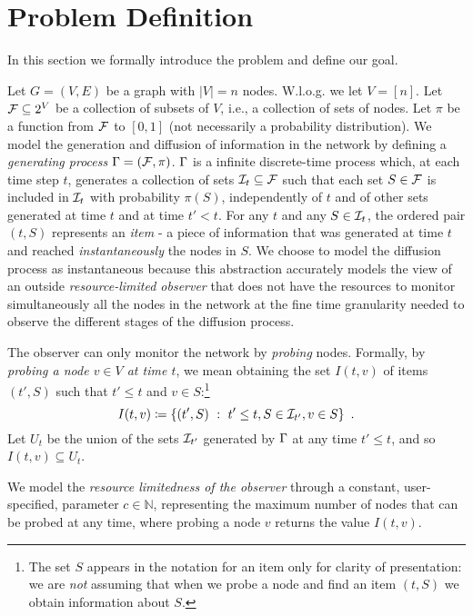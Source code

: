 \section{Problem Definition}\label{sec:prelims}
In this section we formally introduce the problem and define our goal.

Let $G=(V,E)$ be a graph with $|V|=n$ nodes. W.l.o.g. we let $V=[n]$. Let
$\mathcal{F}\subseteq 2^V$ be a collection of subsets of $V$, i.e., a collection of
sets of nodes. Let $\pi$ be a function from $\mathcal{F}$ to $[0,1]$ (not
necessarily a probability distribution). We model the generation and diffusion
of  information in the network by defining a \emph{generating
process} $\Gamma=(\mathcal{F},\pi)$.  $\Gamma$ is a infinite discrete-time process
which, at each time step $t$, generates a collection of sets $\mathcal{I}_t\subseteq\mathcal{F}$ such
that each set $S\in\mathcal{F}$ is included in $\mathcal{I}_t$ with probability $\pi(S)$,
independently of $t$ and of other sets generated at time $t$ and at time $t'<t$.
For any $t$ and any $S\in\mathcal{I}_t$, the ordered pair $(t,S)$ represents an
\emph{item} - a piece of information that was generated at time
$t$ and reached \emph{instantaneously} the nodes in $S$. We choose to model the
diffusion process as instantaneous because this abstraction accurately models the view of an outside
\emph{resource-limited observer} that does not have the resources to monitor simultaneously all
the nodes in the network at the fine time granularity needed to observe the
different stages of the diffusion process.

 The observer can only monitor the network by
\emph{probing} nodes. Formally, by \emph{probing a node $v\in V$ at time $t$},
we mean obtaining the set $I(t,v)$ of items $(t',S)$ such
that $t'\le t$ and $v\in S$:\footnote{The set $S$ appears in the notation for an
	item only for clarity of presentation: we are \emph{not} assuming that when
we probe a node and find an item $(t,S)$ we obtain information about $S$.}
\[
	I(t,v)\coloneqq\{(t',S) ~:~ t'\le t, S\in\mathcal{I}_{t'}, v\in S\}\enspace.
\]
Let $U_t$ be the union of the sets $\mathcal{I}_{t'}$ generated by $\Gamma$
at any time $t'\le t$, and so $I(t,v)\subseteq U_t$.

%
We model the \emph{resource limitedness of the observer} through a constant,
user-specified, parameter $c\in\mathbb{N}$, representing the maximum number of
nodes that can be probed at any time, where probing a node $v$ returns the value $I(t,v)$.

